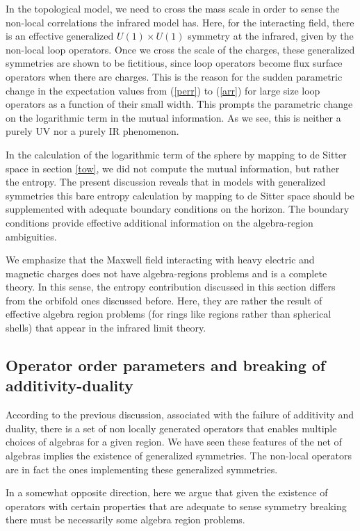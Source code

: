 \documentclass[12pt]{article}
\numberwithin{equation}{section}
\begin{document}
In the topological model, we need to cross the mass scale in order to sense the non-local correlations the infrared model has. Here, for the interacting field, there is an effective generalized $U(1)\times U(1)$ symmetry at the infrared, given by the non-local loop operators. Once we cross the scale of the charges, these generalized symmetries are shown to be fictitious, since loop operators become flux surface operators when there are charges. This is the reason for the sudden parametric change in the expectation values from (\ref{perr}) to (\ref{arr}) for large size loop operators as a function of their small width. This prompts the parametric change on the logarithmic term in the mutual information. As we see, this is neither a purely UV nor a purely IR phenomenon.     

In the calculation of the logarithmic term of the sphere by mapping to de Sitter space in section \ref{tow}, we did not compute the mutual information, but rather the entropy. The present discussion reveals that in models with generalized symmetries this bare entropy calculation by mapping to de Sitter space should be supplemented with adequate boundary conditions on the horizon.  The boundary conditions provide effective additional information on the algebra-region ambiguities.

We emphasize that the Maxwell field interacting with heavy electric and magnetic charges does not have algebra-regions problems and is a complete theory. In this sense, the entropy contribution discussed in this section differs from the orbifold ones discussed before. Here, they are rather the result of effective algebra region problems (for rings like regions rather than spherical shells) that appear in the infrared limit theory. 


\subsection{Operator order parameters and breaking of additivity-duality}

According to the previous discussion, associated with the failure of additivity and duality, there is a set of non locally generated operators that enables multiple choices of algebras for a given region. We have seen these features of the net of algebras implies the existence of generalized symmetries. The non-local operators are in fact the ones implementing these generalized symmetries.

In a somewhat opposite direction, here we argue that given the existence of operators with certain properties that are adequate to sense symmetry breaking there must be necessarily some algebra region problems. 
\end{document}
